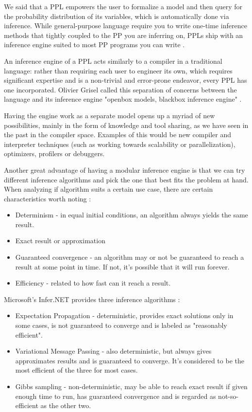\begin{itemsize}
We said that a PPL empowers the user to formalize a model and then query for the
probability distribution of its variables, which is automatically done via
inference. While general-purpose language require you to write one-time
inference methods that tightly coupled to the PP you are inferring on, PPLs
ship with an inference engine suited to most PP programs you can write
\cite{Freer2010}.

An inference engine of a PPL acts similarly to a compiler in a traditional
language: rather than requiring each user to engineer its own, which requires
significant expertise and is a non-trivial and error-prone endeavor, every PPL
has one incorporated. Olivier Grisel called this separation of concerns
between the language and its inference engine "openbox models, blackbox
inference engine" \cite{SciPy}.

Having the engine work as a separate model opens up a myriad of new
possibilities, mainly in the form of knowledge and tool sharing, as we have
seen in the past in the compiler space. Examples of this would be new
compiler and interpreter techniques (such as working towards scalability or
parallelization), optimizers, profilers or debuggers.

Another great advantage of having a modular inference engine is that we can
try different inference algorithms and pick the one that best fits the problem
at hand. When analyzing if algorithm suits a certain use case, there are certain
characteristics worth noting \cite{Minka1999}:

\begin{itemize}
  \item Determinism - in equal initial conditions, an algorithm always yields
the same result.
  \item Exact result or approximation
  \item Guaranteed convergence - an algorithm may or not be guaranteed to reach
a result at some point in time. If not, it's possible that it will run forever.
  \item Efficiency - related to how fast can it reach a result.
\end{itemize}

Microsoft's Infer.NET provides three inference algorithms \cite{msalg}:

\begin{itemize}
  \item Expectation Propagation - deterministic, provides exact solutions only
in some cases, is not guaranteed to converge and is labeled as "reasonably
efficient".
  \item Variational Message Passing - also deterministic, but always gives
approximates results and is guaranteed to converge. It's considered to be the
most efficient of the three for most cases.
  \item Gibbs sampling - non-deterministic, may be able to reach exact result
if given enough time to run, has guaranteed convergence and is regarded as
not-so-efficient as the other two.
\end{itemize}


\end{itemsize}
